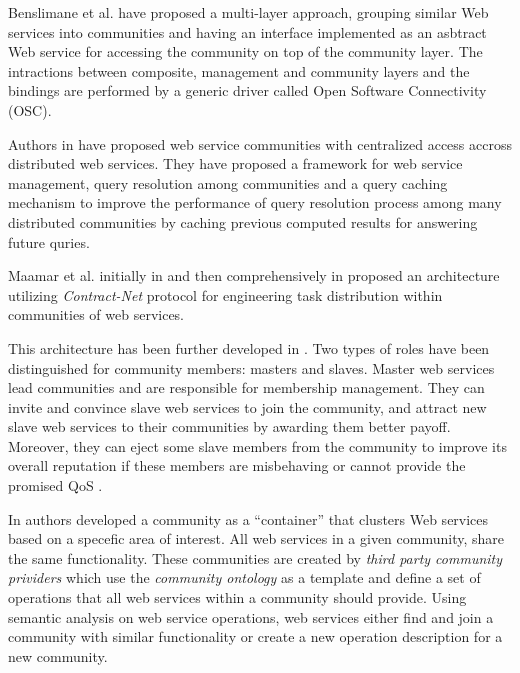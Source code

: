 \documentclass[10pt,journal,cspaper,compsoc]{IEEEtran}
\begin{document}
Benslimane et al. \cite{Liris-2770} have proposed a multi-layer approach, grouping similar Web services into communities and having an interface implemented as an asbtract Web service for accessing the community on top of the community layer. The intractions between composite, management and community layers and the bindings are performed by a generic driver called Open Software Connectivity (OSC).

Authors in \cite{managing-hela-jalel} have proposed web service communities with centralized access accross distributed web services. They have proposed a framework for web service management, query resolution among communities and a query caching mechanism to improve the performance of query resolution process among many distributed communities by caching previous computed results for answering future quries.


Maamar et al. initially in \cite{conf/webist/MaamarLBTS07} and
then comprehensively in \cite{DBLP:journals/ijebr/MaamarSTBB09}
proposed an architecture utilizing \emph{Contract-Net} protocol
for engineering task distribution within communities of web services. 

This architecture has been further developed in
\cite{conf/IEEEscc/BenharrefSBB11, conf/IEEEscc/KhosravifarBMMT10,
conf/aina/LimTM11, CSTintercommunity}. Two types of roles have
been distinguished for community members: masters and slaves.
Master web services lead communities and are responsible for
membership management. They can invite and convince slave web
services to join the community, and attract new slave web services
to their communities by awarding them better payoff. Moreover,
they can eject some slave members from the community to improve
its overall reputation if these members are misbehaving or cannot
provide the promised QoS \cite{DBLP:journals/ijebr/MaamarSTBB09}.

In \cite{Medjahed05adynamic} authors developed a community as a ``container'' that clusters Web services based on a specefic area of interest. All web services in a given community, share the same functionality. These communities are created by \emph{third party community prividers} which use the \emph{community ontology} as a template and define a set of operations that all web services within a community should provide. Using semantic analysis on web service operations, web services either find and join a community with similar functionality or create a new operation description for a new community.
\end{document}
